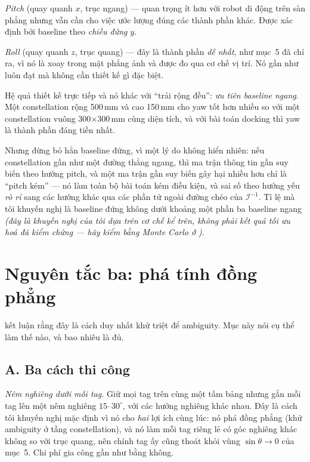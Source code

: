 \documentclass[../../marker.tex]{subfiles}
\begin{document}
\emph{Pitch} (quay quanh \(x\), trục ngang) --- quan trọng ít hơn với robot di động trên sàn phẳng nhưng vẫn cần cho việc ước lượng đúng các thành phần khác. Được xác định bởi baseline theo \emph{chiều đứng} \(y\).

\emph{Roll} (quay quanh \(z\), trục quang) --- đây là thành phần \emph{dễ nhất}, như  mục~5 đã chỉ ra, vì nó là xoay trong mặt phẳng ảnh và được đo qua cơ chế vị trí. Nó gần như luôn đạt mà không cần thiết kế gì đặc biệt.

Hệ quả thiết kế trực tiếp và nó khác với ``trải rộng đều'': \emph{ưu tiên baseline ngang}. Một constellation rộng 500\,mm và cao 150\,mm cho yaw tốt hơn nhiều so với một constellation vuông 300\(\times\)300\,mm cùng diện tích, và với bài toán docking thì yaw là thành phần đáng tiền nhất.

Nhưng đừng bỏ hẳn baseline đứng, vì một lý do không hiển nhiên: nếu constellation gần như một đường thẳng ngang, thì ma trận thông tin gần suy biến theo hướng pitch, và một ma trận gần suy biến gây hại nhiều hơn chỉ là ``pitch kém'' --- nó làm toàn bộ bài toán kém điều kiện, và sai số theo hướng yếu \emph{rò rỉ} sang các hướng khác qua các phần tử ngoài đường chéo của \(\mathcal{I}^{-1}\). Tỉ lệ mà tôi khuyến nghị là baseline đứng không dưới khoảng một phần ba baseline ngang \emph{(đây là khuyến nghị của tôi dựa trên cơ chế kể trên, không phải kết quả tối ưu hoá đã kiểm chứng --- hãy kiểm bằng Monte Carlo ở )}.

\section{Nguyên tắc ba: phá tính đồng phẳng}

 kết luận rằng đây là cách duy nhất khử triệt để ambiguity. Mục này nói cụ thể làm thế nào, và bao nhiêu là đủ.

\subsection{A. Ba cách thi công}

\emph{Nêm nghiêng dưới mỗi tag.} Giữ mọi tag trên cùng một tấm bảng nhưng gắn mỗi tag lên một nêm nghiêng \(15\text{--}30^\circ\), với các hướng nghiêng khác nhau. Đây là cách tôi khuyến nghị mặc định vì nó cho \emph{hai} lợi ích cùng lúc: nó phá đồng phẳng (khử ambiguity ở tầng constellation), và nó làm mỗi tag riêng lẻ có góc nghiêng khác không so với trục quang, nên chính tag ấy cũng thoát khỏi vùng \(\sin\theta \to 0\) của  mục~5. Chi phí gia công gần như bằng không.
\end{document}
